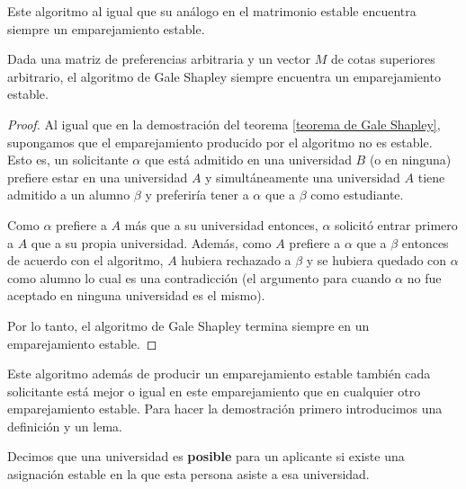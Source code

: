 Este algoritmo al igual que su análogo en el matrimonio estable encuentra siempre un emparejamiento estable.
\begin{cor}
\label{gsu}
Dada una matriz de preferencias arbitraria y un vector $M$ de cotas superiores arbitrario, el algoritmo de Gale Shapley siempre encuentra un emparejamiento estable.
\end{cor}
\begin{proof}
Al igual que en la demostración del teorema \ref{teorema de Gale Shapley}, supongamos que el emparejamiento producido por el algoritmo no es estable. 
Esto es, un solicitante $\alpha$ que está admitido en una universidad $B$ (o en ninguna) prefiere estar en una universidad $A$ y simultáneamente una universidad $A$ tiene admitido a un alumno $\beta$ y preferiría tener a $\alpha$ que a $\beta$ como estudiante. 

Como $\alpha$ prefiere a $A$ más que a su universidad entonces, $\alpha$ solicitó entrar primero a $A$ que a su propia universidad. 
Además, como $A$ prefiere a $\alpha$ que a $\beta$ entonces de acuerdo con el algoritmo, $A$ hubiera rechazado a $\beta$ y se hubiera quedado con $\alpha$ como alumno lo cual es una contradicción (el argumento para cuando $\alpha$ no fue aceptado en ninguna universidad es el mismo). 

Por lo tanto, el algoritmo de Gale Shapley termina siempre en un emparejamiento estable. 
\end{proof}

Este algoritmo además de producir un emparejamiento estable también cada solicitante está mejor o igual en este emparejamiento que en cualquier otro emparejamiento estable. Para hacer la demostración primero introducimos una definición y un lema. 

\begin{dfn}{\cite{GaleShapley}}
\label{Posible}
Decimos que una universidad es \textbf{posible} para un aplicante si existe una asignación estable en la que esta persona asiste a esa universidad.
\end{dfn}

